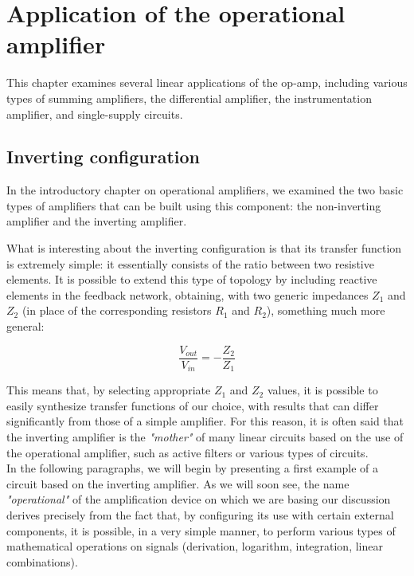 \documentclass[../main.tex]{subfiles}
\begin{document}
\clearpage
\thispagestyle{empty}
\vspace*{7cm}
\section{Application of the operational amplifier}
\vspace*{1.5cm}

This chapter examines several linear applications of the op-amp, including various types of summing amplifiers, the differential amplifier, the instrumentation amplifier, and single-supply circuits.

\vspace*{1cm}

\subsection{Inverting configuration}

In the introductory chapter on operational amplifiers, we examined the two basic types of amplifiers that can be built using this component: the non-inverting amplifier and the inverting amplifier. 

What is interesting about the inverting configuration is that its transfer function is extremely simple: it essentially consists of the ratio between two resistive elements. It is possible to extend this type of topology by including reactive elements in the feedback network, obtaining, with two generic impedances $Z_1$ and $Z_2$ (in place of the corresponding resistors $R_1$ and $R_2$), something much more general:

\begin{equation}
	\frac{V_{out}}{V_{in}} = - \frac{Z_2}{Z_1}
\end{equation}

This means that, by selecting appropriate $Z_1$ and $Z_2$ values, it is possible to easily synthesize transfer functions of our choice, with results that can differ significantly from those of a simple amplifier. 
For this reason, it is often said that the inverting amplifier is the \textit{"mother"} of many linear circuits based on the use of the operational amplifier, such as active filters or various types of circuits.\\

In the following paragraphs, we will begin by presenting a first example of a circuit based on the inverting amplifier. As we will soon see, the name \textit{"operational"} of the amplification device on which we are basing our discussion derives precisely from the fact that, by configuring its use with certain external components, it is possible, in a very simple manner, to perform various types of mathematical operations on signals (derivation, logarithm, integration, linear combinations).
\end{document}
